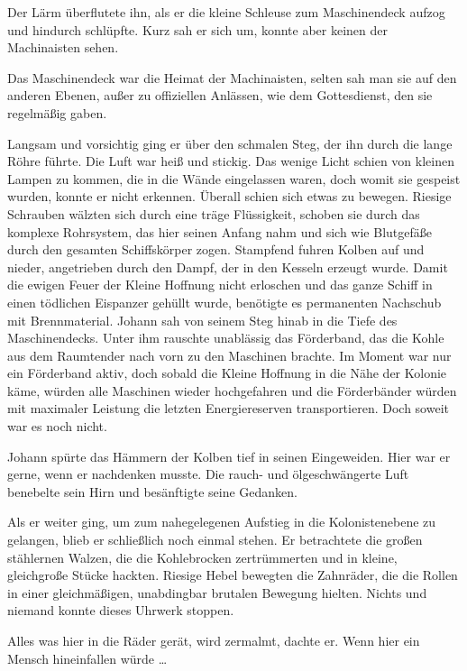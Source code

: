 Der Lärm überflutete ihn, als er die kleine Schleuse zum
Maschinendeck aufzog und hindurch schlüpfte. Kurz sah er sich um,
konnte aber keinen der Machinaisten sehen.

Das Maschinendeck war die Heimat der Machinaisten, selten sah man
sie auf den anderen Ebenen, außer zu offiziellen Anlässen, wie dem
Gottesdienst, den sie regelmäßig gaben.

Langsam und vorsichtig ging er über den schmalen Steg, der ihn
durch die lange Röhre führte. Die Luft war heiß und stickig. Das
wenige Licht schien von kleinen Lampen zu kommen, die in die Wände
eingelassen waren, doch womit sie gespeist wurden, konnte er nicht
erkennen. Überall schien sich etwas zu bewegen. Riesige Schrauben
wälzten sich durch eine träge Flüssigkeit, schoben sie durch das
komplexe Rohrsystem, das hier seinen Anfang nahm und sich wie
Blutgefäße durch den gesamten Schiffskörper zogen. Stampfend fuhren
Kolben auf und nieder, angetrieben durch den Dampf, der in den
Kesseln erzeugt wurde. Damit die ewigen Feuer der Kleine Hoffnung
nicht erloschen und das ganze Schiff in einen tödlichen Eispanzer
gehüllt wurde, benötigte es permanenten Nachschub mit
Brennmaterial. Johann sah von seinem Steg hinab in die Tiefe des
Maschinendecks. Unter ihm rauschte unablässig das Förderband, das
die Kohle aus dem Raumtender nach vorn zu den Maschinen brachte. Im
Moment war nur ein Förderband aktiv, doch sobald die Kleine
Hoffnung in die Nähe der Kolonie käme, würden alle Maschinen wieder
hochgefahren und die Förderbänder würden mit maximaler Leistung die
letzten Energiereserven transportieren. Doch soweit war es noch
nicht.

Johann spürte das Hämmern der Kolben tief in seinen Eingeweiden.
Hier war er gerne, wenn er nachdenken musste. Die rauch- und
ölgeschwängerte Luft benebelte sein Hirn und besänftigte seine
Gedanken.

Als er weiter ging, um zum nahegelegenen Aufstieg in die
Kolonistenebene zu gelangen, blieb er schließlich noch einmal
stehen. Er betrachtete die großen stählernen Walzen, die die
Kohlebrocken zertrümmerten und in kleine, gleichgroße Stücke
hackten. Riesige Hebel bewegten die Zahnräder, die die Rollen in
einer gleichmäßigen, unabdingbar brutalen Bewegung hielten. Nichts
und niemand konnte dieses Uhrwerk stoppen.

Alles was hier in die Räder gerät, wird zermalmt, dachte er. Wenn
hier ein Mensch hineinfallen würde …

\bigpar

